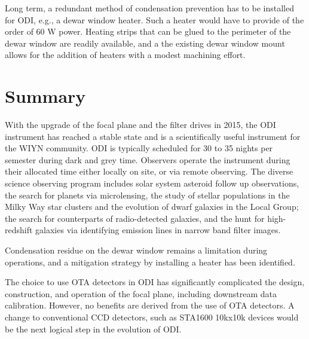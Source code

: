 \documentclass[]{spieman}
\begin{document}
Long term, a redundant method of condensation prevention has to be installed for
ODI, e.g., a dewar window heater. Such a heater would have to provide of the
order of 60 W power. Heating strips that can be glued to the perimeter of the
dewar window are readily available, and a the existing dewar window mount allows
for the addition of heaters with a modest machining effort.


\section{Summary}

With the upgrade of the focal plane and the filter drives in 2015, the ODI
instrument has reached a stable state and is a scientifically useful instrument
for the WIYN community. ODI is typically scheduled for 30 to 35 nights per semester
during dark and grey time. Observers operate the instrument during their allocated 
time either locally on site, or via remote observing. The diverse science observing 
program includes solar system asteroid follow up observations, the search for 
planets via microlensing, the study of stellar populations in the  Milky Way star 
clusters and the evolution of dwarf galaxies in the Local Group;
the search for  counterparts of radio-detected galaxies, and the hunt for high-redshift 
galaxies via identifying emission lines in narrow band filter images. 

Condensation residue on the dewar window remains a limitation during  operations, and a
mitigation strategy by installing a heater has been identified.



The choice to use  OTA detectors in ODI has significantly complicated the
design, construction, and operation of the focal plane, including downstream
data calibration. However, no benefits are derived from the use of OTA
detectors.  A change to conventional CCD detectors, such as STA1600 10kx10k
devices would be the next logical step in the evolution of ODI.



 

\end{document}
